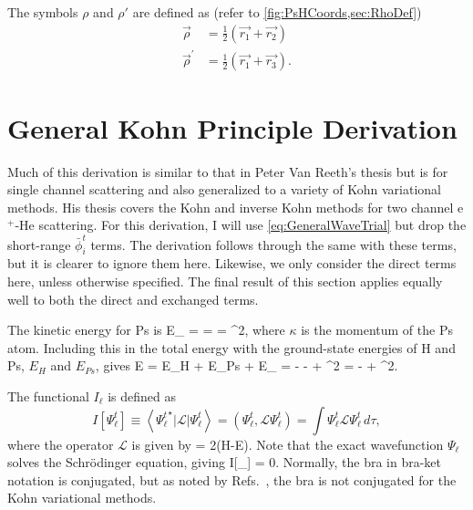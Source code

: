 \documentclass[Dissertation.tex]{subfiles}
\begin{document}
The symbols $\rho$ and $\rho'$ are defined as (refer to \cref{fig:PsHCoords,sec:RhoDef})
\begin{subequations}
\begin{align}
\vec{\rho} &= \frac{1}{2}\left(\vec{r_1} + \vec{r_2}\right) \label{eq:RhoDef}\\
\vec{\rho}^\prime &= \frac{1}{2}\left(\vec{r_1} + \vec{r_3}\right) \label{eq:RhopDef}.
\end{align}
\end{subequations}


\section{General Kohn Principle Derivation}
\label{sec:KohnDerivation}

Much of this derivation is similar to that in Peter Van Reeth's thesis \cite{
VanReethThesis} but is for single channel scattering and also generalized to 
a variety of Kohn variational methods. His thesis covers the Kohn and inverse 
Kohn methods for two channel e$^+$-He scattering. For this derivation, I will 
use \cref{eq:GeneralWaveTrial} but drop the short-range $\bar{\phi}_i^t$ 
terms. The derivation follows through the same with these terms, but it is 
clearer to ignore them here. Likewise, we only consider the direct terms 
here, unless otherwise specified. The final result of this section applies 
equally well to both the direct and exchanged terms.

The kinetic energy for Ps is
\beq
E_{\bm \kappa} =  =  =  \kappa^2,
\label{eq:Wavenumber}
\eeq
where $\kappa$ is the momentum of the Ps atom.
Including this in the total energy with the ground-state energies of H and Ps, $E_H$ and $E_{Ps}$, gives
\beq
E = E_H + E_{Ps} + E_{\bm \kappa} = - -  +  \kappa^2 = - +  \kappa^2.
\eeq

The functional $I_\ell$ is defined as \cite{Adhikari1998}
\begin{equation}
I[\Psi_\ell^t]\equiv \left<{\Psi_\ell^t}^\star | \mathcal{L} | \Psi_\ell^t \right> = \left(\Psi_\ell^t, \mathcal{L} \Psi_\ell^t \right) = \int \Psi_\ell^t \mathcal{L}
  \Psi_\ell^t \,d\tau,
\label{eq:IlDefPsi}
\end{equation}
where the operator $\mathcal{L}$ is given by
\beq
\label{eq:LDef}
 = 2(H-E).
\eeq
Note that the exact wavefunction $\Psi_\ell$ solves the Schr\"{o}dinger equation, giving
\beq
\label{eq:Il0}
I[\Psi_\ell] = 0.
\eeq
\label{BraNote}Normally, the bra in bra-ket notation is conjugated,
but as noted by Refs.~\cite{Cooper2010,Lucchese1989,Zhang1988},
the bra is not conjugated for the Kohn variational methods.
\end{document}

